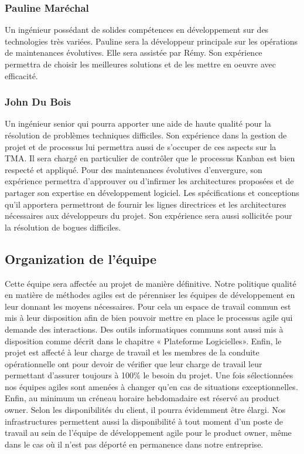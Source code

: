 \subsubsection{Pauline Maréchal}
Un ingénieur possédant de solides compétences en développement sur des technologies très variées. Pauline sera la développeur principale sur les opérations de maintenances évolutives. Elle sera assistée par Rémy. Son expérience permettra de choisir les meilleures solutions et de les mettre en oeuvre avec efficacité. 

\subsubsection{John Du Bois}
Un ingénieur senior qui pourra apporter une aide de haute qualité pour la résolution de problèmes techniques difficiles. Son expérience dans la gestion de projet et de processus lui permettra aussi de s’occuper de ces aspects sur la TMA. Il sera chargé en particulier de contrôler que le processus Kanban est bien respecté et appliqué. Pour des maintenances évolutives d’envergure, son expérience permettra d’approuver ou d’infirmer les architectures proposées et de partager son expertise en développement logiciel. Les spécifications et conceptions qu’il apportera permettront de fournir les lignes directrices et les architectures nécessaires aux développeurs du projet. Son expérience sera aussi sollicitée pour la résolution de bogues difficiles. 

\subsection{Organization de l'équipe}
Cette équipe sera affectée au projet de manière définitive. Notre politique qualité en matière de méthodes agiles est de pérenniser les équipes de développement en leur donnant les moyens nécessaires. Pour cela un espace de travail commun est mis à leur disposition afin de bien pouvoir mettre en place le processus agile qui demande des interactions. Des outils informatiques communs sont aussi mis à disposition comme décrit dans le chapitre « Plateforme Logicielles». Enfin, le projet est affecté à leur charge de travail et les membres de la conduite opérationnelle ont pour devoir de vérifier que leur charge de travail leur permettant d’assurer toujours à 100\% le besoin du projet. Une fois sélectionnées nos équipes agiles sont amenées à changer qu’en cas de situations exceptionnelles. Enfin, au minimum un créneau horaire hebdomadaire est réservé au product owner. Selon les disponibilités du client, il pourra évidemment être élargi. Nos infrastructures permettent aussi la disponibilité à tout moment d’un poste de travail au sein de l’équipe de développement agile pour le product owner, même dans le cas où il n’est pas déporté en permanence dans notre entreprise.  